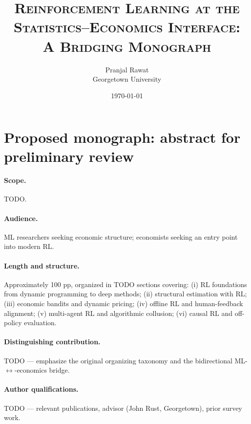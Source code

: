 %





\title{\textsc{Reinforcement Learning at the Statistics--Economics Interface:\\ A Bridging Monograph}}
\author{Pranjal Rawat \\ Georgetown University}
\date{\today}

\maketitle

\section*{Proposed monograph: abstract for preliminary review}


\paragraph{Scope.} TODO.

\paragraph{Audience.} ML researchers seeking economic structure; economists seeking an entry point into modern RL.

\paragraph{Length and structure.} Approximately 100 pp, organized in TODO sections covering: (i) RL foundations from dynamic programming to deep methods; (ii) structural estimation with RL; (iii) economic bandits and dynamic pricing; (iv) offline RL and human-feedback alignment; (v) multi-agent RL and algorithmic collusion; (vi) causal RL and off-policy evaluation.

\paragraph{Distinguishing contribution.} TODO --- emphasize the original organizing taxonomy and the bidirectional ML-$\leftrightarrow$-economics bridge.

\paragraph{Author qualifications.} TODO --- relevant publications, advisor (John Rust, Georgetown), prior survey work.


